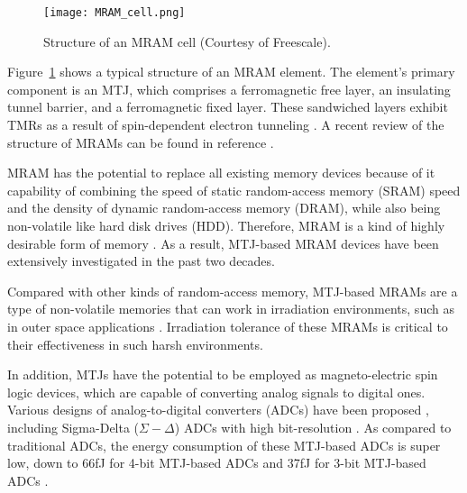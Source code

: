 \documentclass[molecules,review,submit,pdftex,moreauthors]{Definitions/mdpi}
\begin{document}
\begin{figure}
  \begin{center}
   	\texttt{[image: MRAM\_cell.png]}
 \caption{Structure of an MRAM cell (Courtesy of Freescale).}
 \label{Fig:MRAMCell}
  \end{center}
\end{figure}


Figure~\ref{Fig:MRAMCell} shows a typical structure of an MRAM element.  The element's primary component is an MTJ, which comprises a ferromagnetic free layer, an insulating tunnel barrier, and a ferromagnetic fixed layer.  These sandwiched layers exhibit TMRs as a result of spin-dependent electron tunneling \cite{Gallagher1997JAP,Parkin1999JAP,Tehrani1999JAP,Yuasa2007JPd}.  A recent review of the structure of MRAMs can be found in reference \cite{Zhu2008IEEE}.  


MRAM has the potential to replace all existing memory devices because of it capability of combining the speed of static random-access memory (SRAM) speed and the density of dynamic random-access memory (DRAM), while also being non-volatile like  hard disk drives (HDD).  Therefore,  MRAM is a kind of highly desirable form of memory \cite{Yuasa2002Science,Akerman2005Science,Zhu2006MT}.  As a result, MTJ-based MRAM devices have been extensively investigated in the past two decades.


Compared with other kinds of random-access memory, MTJ-based MRAMs are a type of non-volatile memories that can work in irradiation environments, such as in outer space applications \cite{Gerardin2010IEEE}.  Irradiation tolerance of these MRAMs is critical to their effectiveness in such harsh environments.  


In addition, MTJs have the potential to be employed as magneto-electric spin logic devices, which are capable of converting analog signals to digital ones.  Various designs of analog-to-digital converters (ADCs) have been proposed  \cite{Jiang2015IEEE,Maciel2020IEEE,Wu2021IEEE}, including Sigma-Delta ($\Sigma-\Delta$) ADCs with high bit-resolution \cite{Wu2021IEEE}.  As compared to traditional ADCs, the energy consumption of these MTJ-based ADCs is super low, down to \unit{66}{fJ} for 4-bit MTJ-based ADCs and \unit{37}{fJ} for 3-bit MTJ-based ADCs \cite{Maciel2020IEEE}.  
\end{document}
